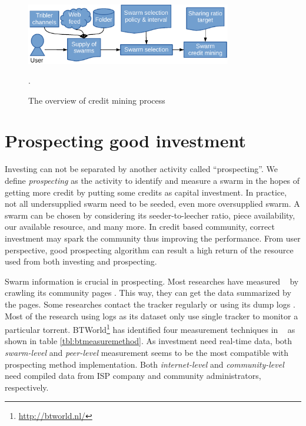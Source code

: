 \begin{figure}[ht]
	\centering
	\includegraphics[width=0.8\textwidth]{pics/creditmining2015.pdf}
	\caption{The overview of credit mining process \cite{2015:creditmining:capota}}.
	\label{fig:cm15}
\end{figure}


\section{Prospecting good investment}

Investing can not be separated by another activity called ``prospecting''. We define \textit{prospecting} as the activity to identify and measure a swarm in the hopes of getting more credit by putting some credits as capital investment. In practice, not all undersupplied swarm need to be seeded, even more oversupplied swarm. A swarm can be chosen by considering its seeder-to-leecher ratio, piece availability, our available resource, and many more. In credit based community, correct investment may spark the community thus improving the performance. From user perspective, good prospecting algorithm can result a high return of the resource used from both investing and prospecting.

Swarm information is crucial in prospecting. Most researches have measured \bt~ by crawling its community pages \cite{2013:survivepriv:jia, 2005:bittorrentcooperation:andrade, 2014:userbehaviourprivate:jia, 2010:pubpriv:meulpolder, 2014:sustainabilitytorrent:chen, 2012:economicbt:kash, 2013:investmentcm:capota, 2009:demandsupplyres:andrade, 2011:interswarm:capota}. This way, they can get the data summarized by the pages. Some researches contact the tracker regularly or using its dump logs \cite{2011:yoshida:crawlbtnet, 2005:bittorrentcooperation:andrade,  2015:freeriderinbtcommunity:das, 2011:interswarm:capota}. Most of the research using logs as its dataset only use single tracker to monitor a particular torrent. BTWorld\footnote{\url{http://btworld.nl/}} has identified four measurement techniques in \bt~\cite{2010:btworld:wojciechowski} as shown in table \ref{tbl:btmeasuremethod}. As investment need real-time data, both \textit{swarm-level} and \textit{peer-level} measurement seems to be the most compatible with prospecting method implementation. Both \textit{internet-level} and \textit{community-level} need compiled data from ISP company and community administrators, respectively.

